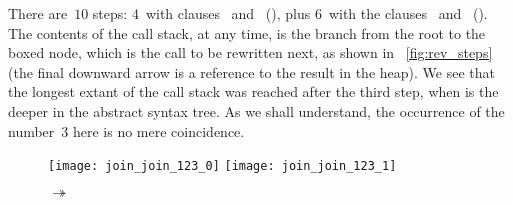 There are~\(10\) steps: \(4\)~with clauses
\clause{\alpha}~and~\clause{\beta} (), plus \(6\)~with
the clauses \clause{\gamma}~and~\clause{\delta}
(). The contents of the call stack, at any time, is
the branch from the root to the boxed node, which is the call to be
rewritten next, as shown in \fig~\vref{fig:rev_steps} (the final
downward arrow is a reference to the result in the heap). We see that
the longest extant of the call stack was reached after the third step,
when  is the deeper in the abstract syntax
tree. As we shall understand, the occurrence of the number~\(3\) here
is no mere coincidence.
\begin{figure}[H]
\centering
\texttt{[image: join\_join\_123\_0]}
\texttt{[image: join\_join\_123\_1]}
\caption{ \(\twoheadrightarrow\)
  \erlcode{[1,2,3]}
\label{fig:rev_321ast}}
\end{figure}

